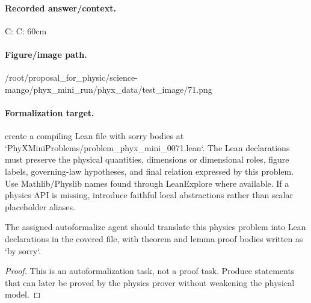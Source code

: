 \paragraph{Recorded answer/context.}
C: C: 60cm

\paragraph{Figure/image path.}
/root/proposal\_for\_physic/science-mango/phyx\_mini\_run/phyx\_data/test\_image/71.png

\paragraph{Formalization target.}
create a compiling Lean file with sorry bodies at `PhyXMiniProblems/problem\_phyx\_mini\_0071.lean`. The Lean declarations must preserve the physical quantities, dimensions or dimensional roles, figure labels, governing-law hypotheses, and final relation expressed by this problem.
Use Mathlib/Physlib names found through LeanExplore where available. If a physics API is missing, introduce faithful local abstractions rather than scalar placeholder aliases.

\begin{theorem}
\label{thm:physics:phyx_mini_0071:target}
The assigned autoformalize agent should translate this physics problem into Lean declarations in the covered file, with theorem and lemma proof bodies written as `by sorry`.
\end{theorem}
\begin{proof}
This is an autoformalization task, not a proof task. Produce statements that can later be proved by the physics prover without weakening the physical model.
\end{proof}


